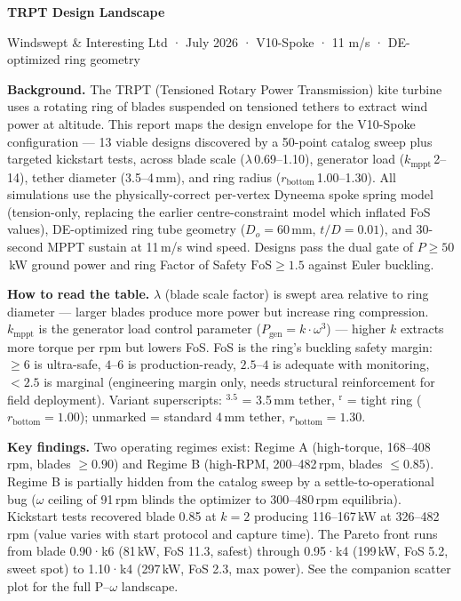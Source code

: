 \documentclass{article}
\begin{document}
\color{textBody}

{\Large\sffamily\bfseries TRPT Design Landscape}

\vspace{4pt}

{\footnotesize\sffamily\color{textDim} Windswept \& Interesting Ltd · July 2026 · V10-Spoke · 11 m/s · DE-optimized ring geometry}

\vspace{10pt}

{\small
\textbf{Background.} The TRPT (Tensioned Rotary Power Transmission) kite turbine uses a rotating ring of blades suspended on tensioned tethers to extract wind power at altitude. This report maps the design envelope for the V10-Spoke configuration — 13 viable designs discovered by a 50-point catalog sweep plus targeted kickstart tests, across blade scale ($\lambda$\,0.69--1.10), generator load ($k_{\text{mppt}}$\,2--14), tether diameter (3.5--4\,mm), and ring radius ($r_{\text{bottom}}$\,1.00--1.30). All simulations use the physically-correct per-vertex Dyneema spoke spring model (tension-only, replacing the earlier centre-constraint model which inflated FoS values), DE-optimized ring tube geometry ($D_o{=}60$\,mm, $t/D{=}0.01$), and 30-second MPPT sustain at 11\,m/s wind speed. Designs pass the dual gate of $P \ge 50$\,kW ground power and ring Factor of Safety $\text{FoS} \ge 1.5$ against Euler buckling.

\textbf{How to read the table.} $\lambda$ (blade scale factor) is swept area relative to ring diameter — larger blades produce more power but increase ring compression. $k_{\text{mppt}}$ is the generator load control parameter ($P_{\text{gen}} = k \cdot \omega^3$) — higher $k$ extracts more torque per rpm but lowers FoS. FoS is the ring's buckling safety margin: $\ge 6$ is ultra-safe, $4$--$6$ is production-ready, $2.5$--$4$ is adequate with monitoring, $<2.5$ is marginal (engineering margin only, needs structural reinforcement for field deployment). Variant superscripts: $^{3.5}$ = 3.5\,mm tether, $^{\text{r}}$ = tight ring ($r_{\text{bottom}}{=}1.00$); unmarked = standard 4\,mm tether, $r_{\text{bottom}}{=}1.30$.

\textbf{Key findings.} Two operating regimes exist: Regime A (high-torque, 168--408\,rpm, blades $\ge 0.90$) and Regime B (high-RPM, 200--482\,rpm, blades $\le 0.85$). Regime B is partially hidden from the catalog sweep by a settle-to-operational bug ($\omega$ ceiling of 91\,rpm blinds the optimizer to 300--480\,rpm equilibria). Kickstart tests recovered blade 0.85 at $k{=}2$ producing 116--167\,kW at 326--482\,rpm (value varies with start protocol and capture time). The Pareto front runs from blade 0.90·k6 (81\,kW, FoS 11.3, safest) through 0.95·k4 (199\,kW, FoS 5.2, sweet spot) to 1.10·k4 (297\,kW, FoS 2.3, max power). See the companion scatter plot for the full P--$\omega$ landscape.
}
\end{document}
